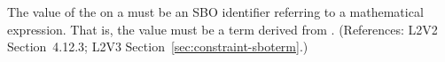 The value of the   on a \Constraint must be an SBO
identifier referring to a mathematical expression.  That is, the value must
be a term derived from \sbomathformula.  (References: L2V2 Section~4.12.3;
L2V3 Section~\ref{sec:constraint-sboterm}.)
